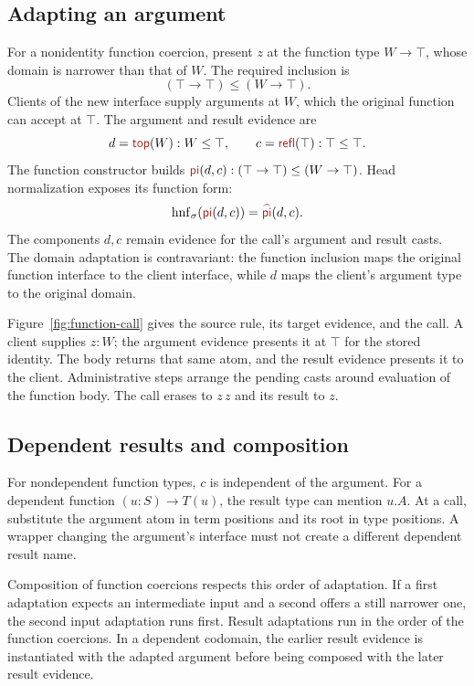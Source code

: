 \subsection*{Adapting an argument}
For a nonidentity function coercion, present $z$ at the function type
$W\to\top$, whose domain is narrower than that of $W$.
The required inclusion is
\[
  (\top\to\top)\le(W\to\top).
\]
Clients of the new interface supply arguments at $W$, which the original
function can accept at $\top$. The argument and result evidence are
\[
 d=\ev{top}(W):W\le\top,\qquad
 c=\ev{refl}(\top):\top\le\top.
\]
The function constructor builds
$\ev{pi}(d,c):(\top\to\top)\le(W\to\top)$.
Head normalization exposes its function form:
\[
 \hnf{\ev{pi}(d,c)}=\form{pi}(d,c).
\]
The components $d,c$ remain evidence for the call's argument and result
casts. The domain adaptation is contravariant: the function inclusion
maps the original function interface to the client interface, while
$d$ maps the client's argument type to the original domain.

Figure~\ref{fig:function-call} gives the source rule, its target
evidence, and the call. A client supplies $z:W$; the argument evidence
presents it at $\top$ for the stored identity. The body returns that
same atom, and the result evidence presents it to the client.
Administrative steps arrange the pending casts around evaluation of the
function body. The call erases to $z\,z$ and its result to $z$.





\FloatBarrier
{}
\subsection*{Dependent results and composition}
For nondependent function types, $c$ is independent of the argument.
For a dependent function $(u:S)\to T(u)$, the result type can mention
$u.A$. At a call, substitute the argument atom in term positions and its
root in type positions. A wrapper changing the argument's interface
must not create a different dependent result name.

Composition of function coercions respects this order of adaptation.
If a first adaptation expects an intermediate input and a second offers
a still narrower one, the second input adaptation runs first.
Result adaptations run in the order of the function coercions.
In a dependent codomain, the earlier result evidence is instantiated
with the adapted argument before being composed with the later result evidence.

